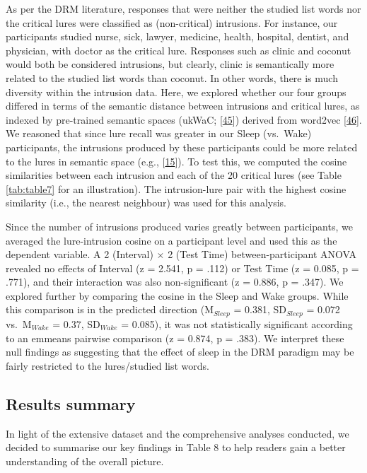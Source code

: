 \documentclass[
]{article}
\begin{document}
As per the DRM literature, responses that were neither the studied list words nor the critical lures were classified as (non-critical) intrusions. For instance, our participants studied nurse, sick, lawyer, medicine, health, hospital, dentist, and physician, with doctor as the critical lure. Responses such as clinic and coconut would both be considered intrusions, but clearly, clinic is semantically more related to the studied list words than coconut. In other words, there is much diversity within the intrusion data. Here, we explored whether our four groups differed in terms of the semantic distance between intrusions and critical lures, as indexed by pre-trained semantic spaces (ukWaC; {[}\protect\hyperlink{ref-baroni2009a}{45}{]}) derived from word2vec {[}\protect\hyperlink{ref-guenther2015a}{46}{]}. We reasoned that since lure recall was greater in our Sleep (vs.~Wake) participants, the intrusions produced by these participants could be more related to the lures in semantic space (e.g., {[}\protect\hyperlink{ref-mak2023a}{15}{]}). To test this, we computed the cosine similarities between each intrusion and each of the 20 critical lures (see Table \ref{tab:table7} for an illustration). The intrusion-lure pair with the highest cosine similarity (i.e., the nearest neighbour) was used for this analysis.

Since the number of intrusions produced varies greatly between participants, we averaged the lure-intrusion cosine on a participant level and used this as the dependent variable. A 2 (Interval) \(\times\) 2 (Test Time) between-participant ANOVA revealed no effects of Interval (z = 2.541, p = .112) or Test Time (z = 0.085, p = .771), and their interaction was also non-significant (z = 0.886, p = .347). We explored further by comparing the cosine in the Sleep and Wake groups. While this comparison is in the predicted direction (M\(_{Sleep}\) = 0.381, SD\(_{Sleep}\) = 0.072 vs.~M\(_{Wake}\) = 0.37, SD\(_{Wake}\) = 0.085), it was not statistically significant according to an emmeans pairwise comparison (z = 0.874, p = .383). We interpret these null findings as suggesting that the effect of sleep in the DRM paradigm may be fairly restricted to the lures/studied list words.

\hypertarget{results-summary}{%
\subsection{Results summary}\label{results-summary}}

In light of the extensive dataset and the comprehensive analyses conducted, we decided to summarise our key findings in Table 8 to help readers gain a better understanding of the overall picture.
\end{document}
